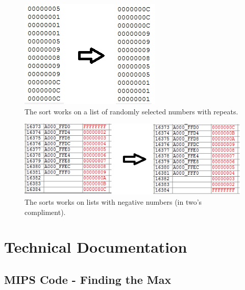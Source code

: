 \documentclass[11pt]{article}
\begin{document}
\begin{figure}[h!]
\centering
\includegraphics[scale=0.9]{sort3.png}
\caption{The sort works on a list of randomly selected numbers with repeats.}
\label{fig:sort3}
\end{figure} 

\begin{figure}[h!]
\centering
\includegraphics[scale=0.9]{sort4.png}
\caption{The sorts works on lists with negative numbers (in two's compliment).}
\label{fig:sort4}
\end{figure} 

\clearpage



\section{Technical Documentation}

\subsection{MIPS Code - Finding the Max}
\end{document}
